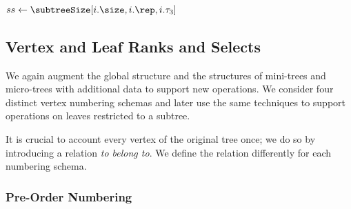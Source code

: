 \begin{algorithm}
\begin{algorithmic}
		\State $ss \gets \subtreeSize[i.\size, i.\rep, i.\tau_3]$
			\State {}
		\Else
			\State {}
		\EndIf
			\State {}
		\Else
			\State {}
		\EndIf
	\Else
		\State {}
	\EndIf
\EndFunction
\end{algorithmic}
\end{algorithm}

\subsection{Vertex and Leaf Ranks and Selects}

We again augment the global structure and the structures of mini-trees and micro-trees with additional data to support new operations.
We consider four distinct vertex numbering schemas and later use the same techniques to support operations on leaves restricted to a subtree.

It is crucial to account every vertex of the original tree once; we do so by introducing a relation \emph{to belong to}.
We define the relation differently for each numbering schema.



\subsubsection{Pre-Order Numbering}

